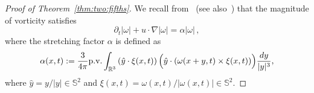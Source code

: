 \documentclass[11pt,reqno]{amsproc}
\numberwithin{equation}{section}
\theoremstyle{remark}
\begin{document}
\begin{proof}[Proof of Theorem~\ref{thm:two:fifths}]
We recall from~\cite{Constantin94a} (see also~\cite{ConstantinFefferman93,Constantin17})
that the magnitude of vorticity satisfies 
\begin{equation}
\partial_t |\omega| + u \cdot \nabla |\omega| = \alpha |\omega| \,,
\label{eq:vortex:stretching:classic}
\end{equation}
where the stretching factor $\alpha$ is defined as
\begin{equation}
\label{eq:vortex:stretching:alpha}
\alpha(x,t) := \frac{3}{4\pi} \text{p.v.} \int_{\mathbb{R}^3} \left(\hat{y} \cdot \xi(x,t)\right) \Bigl( \hat{y} \cdot \left(\omega(x+y,t) \times \xi(x,t)\right)\Bigr) \frac{dy}{|y|^3}
,
\end{equation}
where $\hat{y} = y/|y| \in \mathbb{S}^2$ and $\xi(x,t) = \omega(x,t)/|\omega(x,t)| \in \mathbb{S}^2$.



\end{proof}
\end{document}
